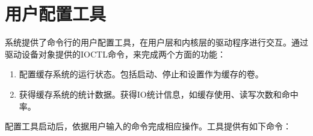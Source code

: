 
\section{用户配置工具}
\label{sec:config_utility}

系统提供了命令行的用户配置工具，在用户层和内核层的驱动程序进行交互。通过驱动设备对象提供的IOCTL命令，来完成两个方面的功能：
\begin{enumerate}
\item 配置缓存系统的运行状态。包括启动、停止和设置作为缓存的卷。
\item 获得缓存系统的统计数据。获得IO统计信息，如缓存使用、读写次数和命中率。
\end{enumerate}

配置工具启动后，依据用户输入的命令完成相应操作。工具提供有如下命令：


